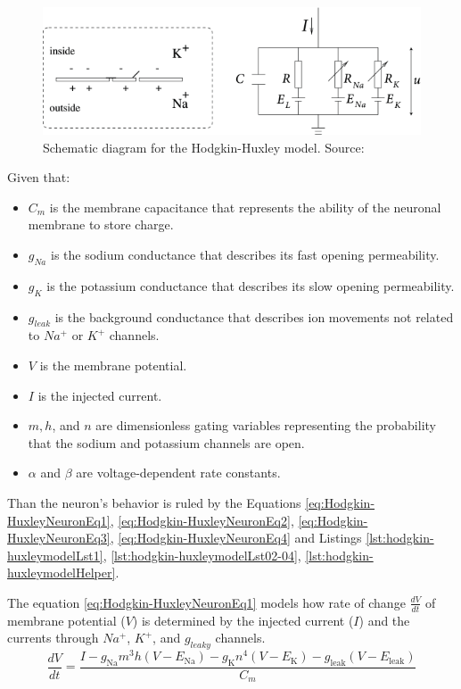 			\begin{figure}[H]
				\centering
				\includegraphics[width=0.7\linewidth]{images/Hodgkin-HuxleyModel}
				\caption{Schematic diagram for the Hodgkin-Huxley model. Source: \cite{gerstner2014neuronal}}
				\label{fig:hodgkin-huxleymodel}
			\end{figure}
			
			\par Given that:
			\begin{itemize}
				\item $C_m$ is the membrane capacitance that represents the ability of the neuronal membrane to store charge.
				\item $g_{Na}$ is the sodium conductance that describes its fast opening permeability.
				\item $g_K$ is the potassium conductance that describes its slow opening permeability.
				\item $g_{leak}$ is the background conductance that describes ion movements not related to $Na^+$ or $K^+$ channels.
				\item $V$ is the membrane potential.
				\item $I$ is the injected current.
				\item $m, h$, and $n$ are dimensionless gating variables representing the probability that the sodium and potassium channels are open.
				\item $\alpha$ and $\beta$ are voltage-dependent rate constants.
			\end{itemize}
		
			\par Than the neuron's behavior is ruled by the Equations \ref{eq:Hodgkin-HuxleyNeuronEq1}, \ref{eq:Hodgkin-HuxleyNeuronEq2}, \ref{eq:Hodgkin-HuxleyNeuronEq3}, \ref{eq:Hodgkin-HuxleyNeuronEq4} and Listings \ref{lst:hodgkin-huxleymodelLst1}, \ref{lst:hodgkin-huxleymodelLst02-04}, \ref{lst:hodgkin-huxleymodelHelper}.\newline
			
			\par The equation \ref{eq:Hodgkin-HuxleyNeuronEq1} models how rate of change $\frac{dV}{dt}$ of membrane potential ($V$) is determined by the injected current ($I$) and the currents through $Na^+$, $K^+$, and $g_{leaky}$ channels.
			\begin{equation}
				\label{eq:Hodgkin-HuxleyNeuronEq1}
				\frac{dV}{dt} = \dfrac{I - g_{\text{Na}}m^3h(V - E_{\text{Na}}) - g_{\text{K}}n^4(V - E_{\text{K}}) - g_{\text{leak}}(V - E_{\text{leak}})}{C_m}
			\end{equation}
			
	
